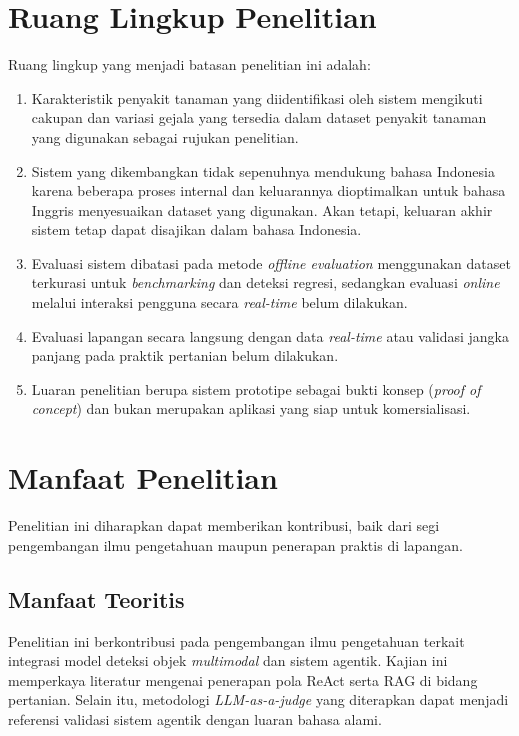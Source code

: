 \section{Ruang Lingkup Penelitian}
Ruang lingkup yang menjadi batasan penelitian ini adalah: 
\begin{enumerate}[nosep]
    \item Karakteristik penyakit tanaman yang diidentifikasi oleh sistem mengikuti cakupan dan variasi gejala yang tersedia dalam dataset penyakit tanaman yang digunakan sebagai rujukan penelitian.
    \item Sistem yang dikembangkan tidak sepenuhnya mendukung bahasa Indonesia karena beberapa proses internal dan keluarannya dioptimalkan untuk bahasa Inggris menyesuaikan dataset yang digunakan. Akan tetapi, keluaran akhir sistem tetap dapat disajikan dalam bahasa Indonesia.
    \item Evaluasi sistem dibatasi pada metode \textit{offline evaluation} menggunakan dataset terkurasi untuk \textit{benchmarking} dan deteksi regresi, sedangkan evaluasi \textit{online} melalui interaksi pengguna secara \textit{real-time} belum dilakukan.
    \item Evaluasi lapangan secara langsung dengan data \textit{real-time} atau validasi jangka panjang pada praktik pertanian belum dilakukan.
    \item Luaran penelitian berupa sistem prototipe sebagai bukti konsep (\textit{proof of concept}) dan bukan merupakan aplikasi yang siap untuk komersialisasi.
\end{enumerate}

\section{Manfaat Penelitian} 
Penelitian ini diharapkan dapat memberikan kontribusi, baik dari segi pengembangan ilmu pengetahuan maupun penerapan praktis di lapangan.

\subsection{Manfaat Teoritis}
Penelitian ini berkontribusi pada pengembangan ilmu pengetahuan terkait integrasi model deteksi objek \textit{multimodal} dan sistem agentik. Kajian ini memperkaya literatur mengenai penerapan pola ReAct serta RAG di bidang pertanian. Selain itu, metodologi \textit{LLM-as-a-judge} yang diterapkan dapat menjadi referensi validasi sistem agentik dengan luaran bahasa alami.

